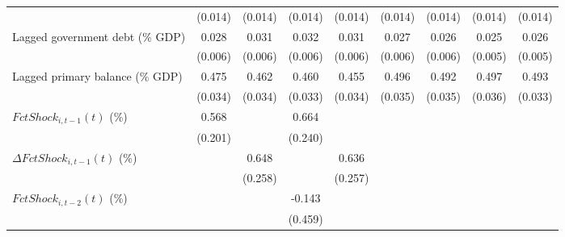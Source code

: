 {\begin{tabular}{l*{8}{c}}
                    &     (0.014)         &     (0.014)         &     (0.014)         &     (0.014)         &     (0.014)         &     (0.014)         &     (0.014)         &     (0.014)         \\
\addlinespace
Lagged government debt (\% GDP)&       0.028\sym{***}&       0.031\sym{***}&       0.032\sym{***}&       0.031\sym{***}&       0.027\sym{***}&       0.026\sym{***}&       0.025\sym{***}&       0.026\sym{***}\\
                    &     (0.006)         &     (0.006)         &     (0.006)         &     (0.006)         &     (0.006)         &     (0.006)         &     (0.005)         &     (0.005)         \\
\addlinespace
Lagged primary balance (\% GDP)&       0.475\sym{***}&       0.462\sym{***}&       0.460\sym{***}&       0.455\sym{***}&       0.496\sym{***}&       0.492\sym{***}&       0.497\sym{***}&       0.493\sym{***}\\
                    &     (0.034)         &     (0.034)         &     (0.033)         &     (0.034)         &     (0.035)         &     (0.035)         &     (0.036)         &     (0.033)         \\
\addlinespace
$ FctShock_{i,t-1}(t)$ (\%)&       0.568\sym{***}&                     &       0.664\sym{***}&                     &                     &                     &                     &                     \\
                    &     (0.201)         &                     &     (0.240)         &                     &                     &                     &                     &                     \\
\addlinespace
$ \Delta FctShock_{i,t-1}(t)$ (\%)&                     &       0.648\sym{**} &                     &       0.636\sym{**} &                     &                     &                     &                     \\
                    &                     &     (0.258)         &                     &     (0.257)         &                     &                     &                     &                     \\
\addlinespace
$ FctShock_{i,t-2}(t)$ (\%)&                     &                     &      -0.143         &                     &                     &                     &                     &                     \\
                    &                     &                     &     (0.459)         &                     &                     &                     &                     &                     \\

\end{tabular}}
